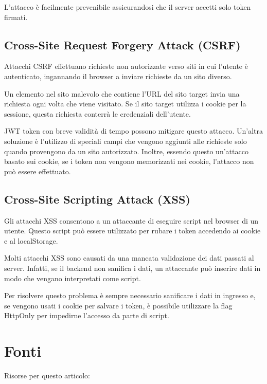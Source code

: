 \documentclass{article}
\begin{document}
L'attacco è facilmente prevenibile assicurandosi che il server accetti solo token firmati.

\subsection{Cross-Site Request Forgery Attack (CSRF)}
Attacchi CSRF effettuano richieste non autorizzate verso siti in cui l'utente è autenticato, ingannando il browser a inviare richieste da un sito diverso.

Un elemento nel sito malevolo che contiene l'URL del sito target invia una richiesta ogni volta che viene visitato.
Se il sito target utilizza i cookie per la sessione, questa richiesta conterrà le credenziali dell'utente.

JWT token con breve validità di tempo possono mitigare questo attacco.
Un'altra soluzione è l'utilizzo di speciali campi che vengono aggiunti alle richieste solo quando provengono da un sito autorizzato.
Inoltre, essendo questo un'attacco basato sui cookie, se i token non vengono memorizzati nei cookie, l'attacco non può essere effettuato.

\subsection{Cross-Site Scripting Attack (XSS)}
Gli attacchi XSS consentono a un attaccante di eseguire script nel browser di un utente.
Questo script può essere utilizzato per rubare i token accedendo ai cookie e al localStorage.

Molti attacchi XSS sono causati da una mancata validazione dei dati passati al server.
Infatti, se il backend non sanifica i dati, un attaccante può inserire dati in modo che vengano interpretati come script.

Per risolvere questo problema è sempre necessario sanificare i dati in ingresso e, se vengono usati i cookie per salvare i token, è possibile utilizzare la flag HttpOnly per impedirne l'accesso da parte di script.


\section*{Fonti}
Risorse per questo articolo:
\end{document}
